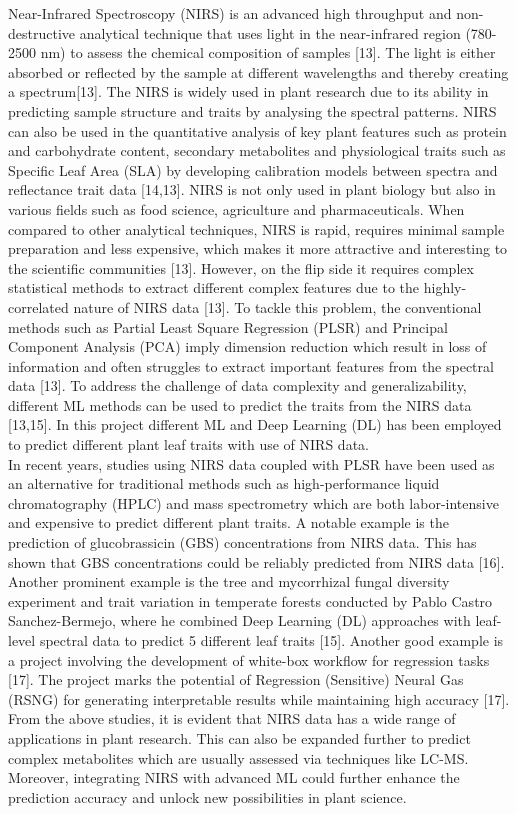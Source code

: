 \documentclass[12pt,a4paper]{report}
\begin{document}
Near-Infrared Spectroscopy (NIRS) is an advanced high throughput and non-destructive analytical technique that uses light in the near-infrared region (780-2500 nm) to assess the chemical composition of samples [13]. The light is either absorbed or reflected by the sample at different wavelengths and thereby creating a spectrum[13]. The NIRS is widely used in plant research due to its ability in predicting sample structure and traits by analysing the spectral patterns.
NIRS can also be used in the quantitative analysis of key plant features such as protein and carbohydrate content, secondary metabolites and physiological traits such as Specific Leaf Area (SLA) by developing calibration models between spectra and reflectance trait data [14,13]. NIRS is not only used in plant biology but also in various fields such as food science, agriculture and pharmaceuticals. When compared to other analytical techniques, NIRS is rapid, 
requires minimal sample preparation and less expensive, which makes it more attractive and interesting to the scientific communities [13]. However, on the flip side it requires complex statistical methods to extract different complex features due to the highly-correlated nature of NIRS data [13]. To tackle this problem, the conventional methods such as Partial Least Square Regression (PLSR) and Principal Component Analysis (PCA) imply dimension reduction which 
result in loss of information and often struggles to extract important features from the spectral data [13]. To address the challenge of data complexity and generalizability, different ML methods can be used to predict the traits from the NIRS data [13,15]. In this project different ML and Deep Learning (DL) has been employed to predict different plant leaf traits with use of NIRS data. \\


In recent years, studies using NIRS data coupled with PLSR have been used as an alternative for traditional methods such as high-performance liquid chromatography (HPLC) and mass spectrometry which are both labor-intensive and expensive to predict different plant traits. A notable example is the prediction of glucobrassicin (GBS) concentrations from NIRS data. This has shown that GBS 
concentrations could be reliably predicted from NIRS data [16]. Another prominent example is the tree and mycorrhizal fungal diversity experiment and  trait variation in temperate forests  conducted by Pablo Castro Sanchez-Bermejo, where he combined Deep Learning (DL) approaches with leaf-level spectral data to predict 5 different leaf traits [15]. Another good  example is a 
project involving the development of white-box  workflow for regression tasks [17]. The project marks the potential of Regression (Sensitive) Neural Gas (RSNG) for generating interpretable results while maintaining high accuracy [17]. From the above studies, it is evident that NIRS data has a wide range of applications in plant research. This can also be expanded further to predict 
complex metabolites which are usually assessed via techniques like LC-MS. Moreover, integrating NIRS with advanced ML could further enhance the prediction accuracy and unlock new possibilities in plant science. \\
\end{document}
